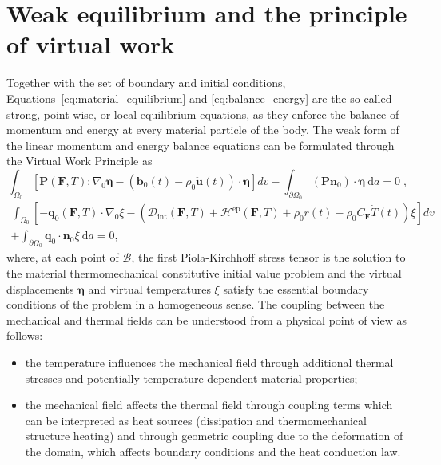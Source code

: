 \section{Weak equilibrium and the principle of virtual work}

Together with the set of boundary and initial conditions, Equations~\eqref{eq:material_equilibrium} and \eqref{eq:balance_energy} are the so-called strong, point-wise, or local equilibrium equations, as they enforce the balance of momentum and energy at every material particle of the body.
The weak form of the linear momentum and energy balance equations can be formulated through the Virtual Work Principle as
\begin{equation} \label{eq:weak_momentum_balance}
  \int_{\Omega_0} [\bm{P}(\bm{F},T):\nabla_0 \bm{\eta} - (\bm{b}_0(t)-\rho_0\ddot{\bm{u}}(t))\cdot \bm{\eta}]d v - \int_{\partial\Omega_0} (\bm{P}\bm{n}_{0})\cdot \bm{\eta} \ \mathrm{d} a = 0\;,
\end{equation}
\begin{multline} \label{eq:weak_energy_balance}
  \int_{\Omega_0}   \left[-\bm{q}_{0}(\bm{F},T)\cdot \nabla_0 \xi - \left(\mathcal D_\text{int}(\bm{F},T)+\mathcal H^\text{ep}(\bm{F},T)+ \rho_0 r(t)-\rho_0 C_{\bm F}\dot T(t)\right) \xi\right]d v\\ + \int_{\partial\Omega_0} \bm{q}_{0}\cdot \bm{n}_{0} \xi \ \mathrm{d} a = 0,
\end{multline}
where, at each point of $\mathscr{B}$, the first Piola-Kirchhoff stress tensor is the solution to the material thermomechanical constitutive initial value problem and the virtual displacements \(\bm{\eta}\) and virtual temperatures \(\xi\) satisfy the essential boundary conditions of the problem in a homogeneous sense.
The coupling between the mechanical and thermal fields can be understood from a physical point of view as follows:
\begin{itemize}
\item the temperature influences the mechanical field through additional thermal stresses and potentially temperature-dependent material properties;
\item  the mechanical field affects the thermal field through coupling terms which can be interpreted as heat sources (dissipation and thermomechanical structure heating) and through geometric coupling due to the deformation of the domain, which affects boundary conditions and the heat conduction law.
\end{itemize}


